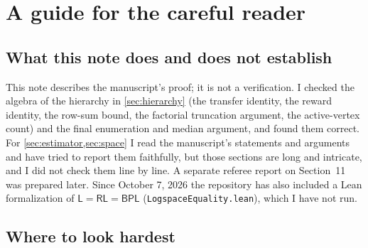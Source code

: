 \documentclass[11pt]{article}
\theoremstyle{definition}
\theoremstyle{remark}
\newcommand{\Lc}{\mathsf L}
\newcommand{\RL}{\mathsf{RL}}
\newcommand{\BPL}{\mathsf{BPL}}
\begin{document}
\section{A guide for the careful reader}\label{sec:reader}

\subsection{What this note does and does not establish}

This note describes the manuscript's proof; it is not a verification. I checked
the algebra of the hierarchy in \cref{sec:hierarchy} (the transfer identity, the
reward identity, the row-sum bound, the factorial truncation argument, the
active-vertex count) and the final enumeration and median argument, and found
them correct. For \cref{sec:estimator,sec:space} I read the manuscript's
statements and arguments and have tried to report them faithfully, but those
sections are long and intricate, and I did not check them line by line. A
separate referee report on Section~11 was prepared later. Since October 7, 2026
the repository has also included a Lean formalization of $\Lc=\RL=\BPL$
(\texttt{LogspaceEquality.lean}), which I have not run.

\subsection{Where to look hardest}
\end{document}
